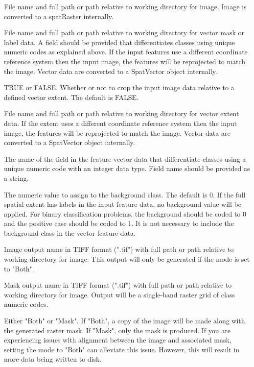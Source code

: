 \documentclass[a4paper]{book}
\begin{document}
\begin{Arguments}
\begin{ldescription}
\item[\code{image}] File name and full path or path relative to working directory for image.
Image is converted to a spatRaster internally.

\item[\code{features}] File name and full path or path relative to working directory
for vector mask or label data. A field should be provided that differentiates
classes using unique numeric codes as explained above. If the input features
use a different coordinate reference system then the input image, the features
will be reprojected to match the image. Vector data are converted to a
SpatVector object internally.

\item[\code{crop}] TRUE or FALSE. Whether or not to crop the input image data relative
to a defined vector extent. The default is FALSE.

\item[\code{extent}] File name and full path or path relative to working directory for
vector extent data. If the extent uses a different coordinate reference system
then the input image, the features will be reprojected to match the image.
Vector data are converted to a SpatVector object internally.

\item[\code{field}] The name of the field in the feature vector data that differentiate
classes using a unique numeric code with an integer data type. Field name should
be provided as a string.

\item[\code{background}] The numeric value to assign to the background class. The default
is 0. If the full spatial extent has labels in the input feature data, no background
value will be applied. For binary classification problems, the background should be
coded to 0 and the positive case should be coded to 1. It is not necessary to
include the background class in the vector feature data.

\item[\code{outImage}] Image output name in TIFF format (".tif") with full path or path
relative to working directory for image. This output will only be generated if
the mode is set to "Both".

\item[\code{outMask}] Mask output name in TIFF format (".tif") with full path or path
relative to working directory for image. Output will be a single-band raster
grid of class numeric codes.

\item[\code{mode}] Either "Both" or "Mask". If "Both", a copy of the image will be made
along with the generated raster mask. If "Mask", only the mask is produced. If
you are experiencing issues with alignment between the image and associated mask,
setting the mode to "Both" can alleviate this issue. However, this will result in
more data being written to disk.
\end{ldescription}
\end{Arguments}
\end{document}
